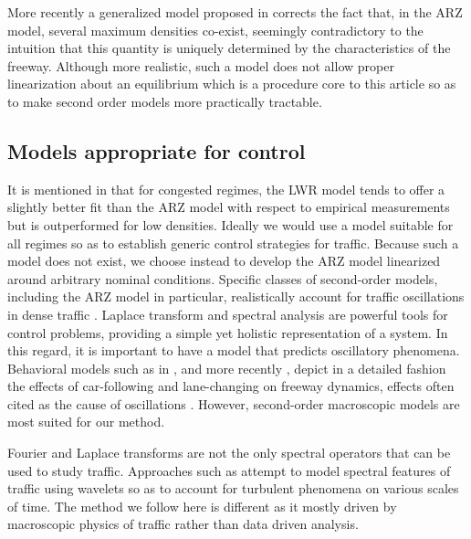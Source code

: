 \documentclass[preprint]{elsarticle}
\begin{document}

More recently a generalized model proposed in \cite{Fan} corrects the fact that, in the ARZ model, several maximum densities co-exist, seemingly contradictory to the intuition that this quantity is uniquely determined by the characteristics of the freeway. Although more realistic, such a model does not allow proper linearization about an equilibrium which is a procedure core to this article so as to make second order models more practically tractable.

\subsection{Models appropriate for control}
It is mentioned in \cite{Fan} that for congested regimes, the 
LWR model tends to offer a slightly better fit than the ARZ model with respect to empirical measurements but is outperformed for low densities. Ideally we would use a model suitable for all regimes so as to establish generic control strategies for traffic. Because such a model does not exist, we choose instead to develop the ARZ model linearized around arbitrary nominal conditions. Specific classes of second-order models, including the ARZ model in particular, realistically account for traffic oscillations in dense traffic \cite{Greenberg_congestionredux}. Laplace transform and spectral analysis are powerful tools for control problems, providing a simple yet holistic representation of a system. In this regard,
it is important to have a model that predicts oscillatory phenomena. Behavioral models such as in \cite{Newell}, and more recently
\cite{Chen2012}, depict in a detailed fashion the effects of car-following
and lane-changing on freeway dynamics, effects often cited as the cause of oscillations \cite{Mauch02freewaytraffic, lanechangin2005,lanechanging2007}. However, second-order macroscopic models are most suited for our method. 

Fourier and Laplace transforms are not the only spectral operators that can be used to study traffic. Approaches such as \cite{Zheng2011} attempt to model spectral features of traffic using wavelets so as to account for turbulent phenomena on various scales of time. The method we follow here is different as it mostly driven by macroscopic physics of traffic rather than data driven analysis.
\end{document}
